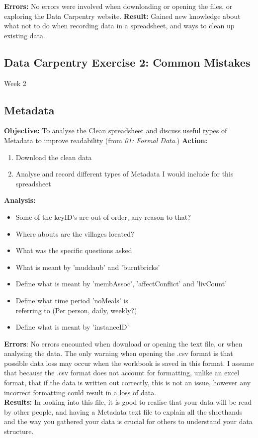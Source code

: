 \documentclass{article}
\begin{document}
\textbf{Errors:} No errors were involved when downloading or opening the files, or exploring the Data Carpentry website.
\newline
\textbf{Result:} Gained new knowledge about what not to do when recording data in a spreadsheet, and ways to clean up existing data.
\vspace{5mm}
\newpage
\begin{center}
\section{Data Carpentry Exercise 2: Common Mistakes}
Week 2
\subsection{Metadata}
\end{center}
\textbf{Objective:} To analyse the Clean spreadsheet and discuss useful types of Metadata to improve readability (from \textit{01: Formal Data}.)
\newline
\textbf{Action:}
\begin{enumerate}
    \item Download the clean data
    \item Analyse and record different types of Metadata I would include for this spreadsheet
\end{enumerate}
\textbf{Analysis:}
\begin{itemize}
    \item Some of the keyID's are out of order, any reason to that?
    \item Where abouts are the villages located?
    \item What was the specific questions asked
    \item What is meant by 'muddaub' and 'burntbricks'
    \item Define what is meant by 'membAssoc', 'affectConflict' and 'livCount'
    \item Define what time period 'noMeals' is \\ referring to (Per person, daily, weekly?)
    \item Define what is meant by 'instanceID'
\end{itemize}
\textbf{Errors}: No errors encounted when download or opening the text file, or when analysing the data. The only warning when opening the .csv format is that possible data loss may occur when the workbook is saved in this format. I assume that because the .csv format does not account for formatting, unlike an excel format, that if the data is written out correctly, this is not an issue, however any incorrect formatting could result in a loss of data.\\
\textbf{Results:} In looking into this file, it is good to realise that your data will be read by other people, and having a Metadata text file to explain all the shorthands and the way you gathered your data is crucial for others to understand your data structure. 
\newpage
\end{document}
